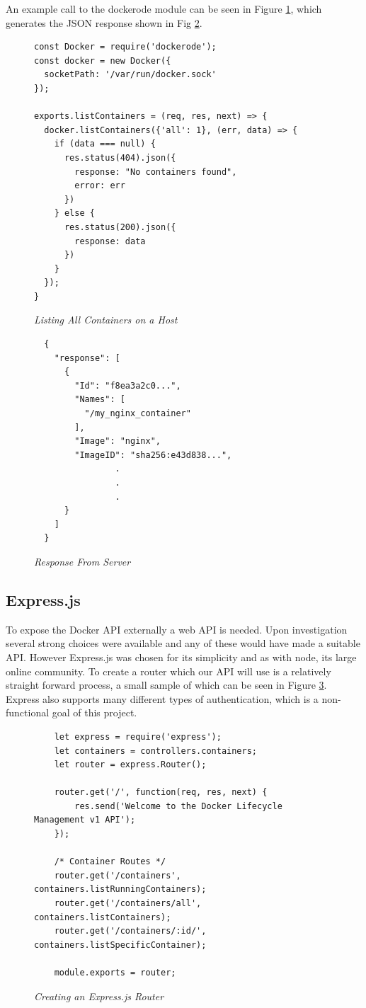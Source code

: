 An example call to the dockerode module can be seen in Figure \ref{fig:dockerode}, which generates the JSON response shown in Fig \ref{fig:response}.

\begin{figure}[!ht]
\begin{lstlisting}
const Docker = require('dockerode');
const docker = new Docker({
  socketPath: '/var/run/docker.sock'
});

exports.listContainers = (req, res, next) => {
  docker.listContainers({'all': 1}, (err, data) => {
    if (data === null) {
      res.status(404).json({
        response: "No containers found",
        error: err
      })
    } else {
      res.status(200).json({
        response: data
      })
    }
  });
}
\end{lstlisting}
\caption{\em Listing All Containers on a Host}
\label{fig:dockerode}
\end{figure}

\begin{figure}[!ht]
\begin{lstlisting}
  {
    "response": [
      {
        "Id": "f8ea3a2c0...",
        "Names": [
          "/my_nginx_container"
        ],
        "Image": "nginx",
        "ImageID": "sha256:e43d838...",
                .
                .
                .
      }
    ]
  }
\end{lstlisting}
\caption{\em Response From Server}
\label{fig:response}
\end{figure}

\newpage
\subsection{Express.js}
\label{sub:express}

To expose the Docker \gls{API} externally a web API is needed. Upon investigation several strong choices were available and any of these would have made a suitable API. However Express.js was chosen for its simplicity and as with node, its large online community. To create a router which our API will use is a relatively straight forward process, a small sample of which can be seen in Figure \ref{fig:router}. Express also supports many different types of authentication, which is a non-functional goal of this project. 

\begin{figure}[!ht]
\begin{lstlisting}
	let express	= require('express');
	let containers = controllers.containers;
	let router = express.Router();

	router.get('/', function(req, res, next) {
	    res.send('Welcome to the Docker Lifecycle Management v1 API');
	});

	/* Container Routes */
	router.get('/containers', containers.listRunningContainers);
	router.get('/containers/all', containers.listContainers);
	router.get('/containers/:id/', containers.listSpecificContainer);

	module.exports = router;
\end{lstlisting}
\caption{\em Creating an Express.js Router}
\label{fig:router}
\end{figure}

